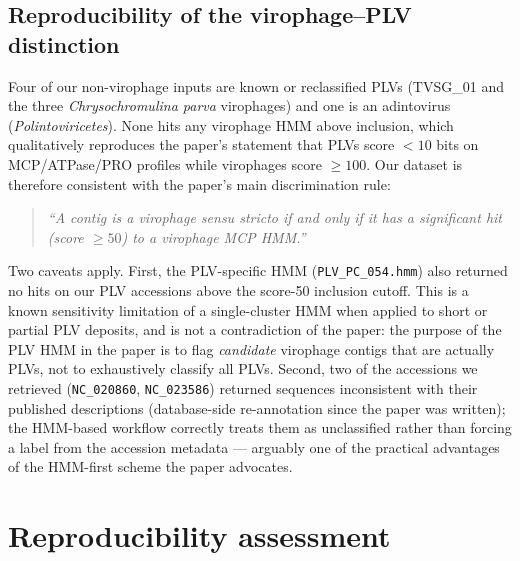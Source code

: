 \documentclass[11pt,a4paper]{article}
\begin{document}
\subsection{Reproducibility of the virophage--PLV distinction}

Four of our non-virophage inputs are known or reclassified PLVs
(TVSG\_01 and the three \emph{Chrysochromulina parva} virophages) and one
is an adintovirus (\emph{Polintoviricetes}). None hits any virophage HMM
above inclusion, which qualitatively reproduces the paper's statement that
PLVs score $<10$ bits on MCP/ATPase/PRO profiles while virophages score
$\geq 100$. Our dataset is therefore consistent with the paper's main
discrimination rule:
\begin{quote}\itshape
``A contig is a virophage \emph{sensu stricto} if and only if it has a
significant hit (score $\geq 50$) to a virophage MCP HMM.''
\end{quote}

Two caveats apply. First, the PLV-specific HMM (\texttt{PLV\_PC\_054.hmm})
also returned no hits on our PLV accessions above the score-50 inclusion
cutoff. This is a known sensitivity limitation of a single-cluster HMM
when applied to short or partial PLV deposits, and is not a contradiction
of the paper: the purpose of the PLV HMM in the paper is to flag
\emph{candidate} virophage contigs that are actually PLVs, not to
exhaustively classify all PLVs. Second, two of the accessions we
retrieved (\texttt{NC\_020860}, \texttt{NC\_023586}) returned sequences
inconsistent with their published descriptions (database-side
re-annotation since the paper was written); the HMM-based workflow
correctly treats them as unclassified rather than forcing a label from
the accession metadata --- arguably one of the practical advantages of
the HMM-first scheme the paper advocates.

\section{Reproducibility assessment}
\end{document}
